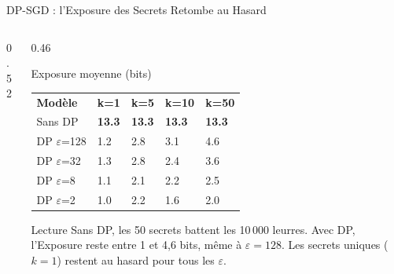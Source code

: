\begin{frame}{DP-SGD : l'Exposure des Secrets Retombe au Hasard}
    \begin{columns}[T]
        \begin{column}{0.52\textwidth}
        \end{column}
        \begin{column}{0.46\textwidth}
            \begin{block}{Exposure moyenne (bits)}
                \renewcommand{\arraystretch}{1.0}
                {\scriptsize
                \begin{tabularx}{\textwidth}{l X X X X}
                    \rowcolor{TSPblue}\color{white}\textbf{Modèle} & \color{white}\textbf{k=1} & \color{white}\textbf{k=5} & \color{white}\textbf{k=10} & \color{white}\textbf{k=50} \\
                    Sans DP & \textbf{13.3} & \textbf{13.3} & \textbf{13.3} & \textbf{13.3} \\
                    \rowcolor{TSPgrey} DP $\varepsilon$=128 & 1.2 & 2.8 & 3.1 & 4.6 \\
                    DP $\varepsilon$=32 & 1.3 & 2.8 & 2.4 & 3.6 \\
                    \rowcolor{TSPgrey} DP $\varepsilon$=8 & 1.1 & 2.1 & 2.2 & 2.5 \\
                    DP $\varepsilon$=2 & 1.0 & 2.2 & 1.6 & 2.0 \\
                \end{tabularx}
                }
            \end{block}
            \begin{alertblock}{Lecture}
                \scriptsize Sans DP, les 50 secrets battent les 10\,000 leurres. Avec DP, l'Exposure reste entre 1 et 4,6 bits, même à $\varepsilon = 128$. Les secrets uniques ($k=1$) restent au hasard pour tous les $\varepsilon$.
            \end{alertblock}
        \end{column}
    \end{columns}
\end{frame}

